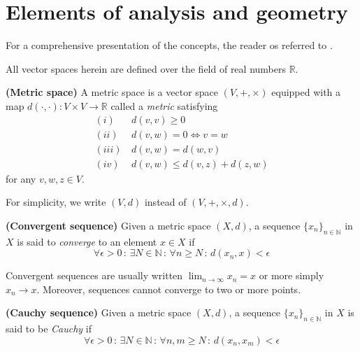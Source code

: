 \appendix

\chapter{Elements of analysis and geometry}
\label{app.elements_analysis_algebra}

For a comprehensive presentation of the concepts, the reader os referred to \cite{searcoid2002elements,pugh2002real}. 

All vector spaces herein are defined over the field of real numbers $\mathbb{R}$.

\begin{definition}
	\textbf{(Metric space)}
	A metric space is a vector space $(V,+,\times)$ equipped with a map $d(\cdot,\cdot):V \times V \rightarrow \mathbb{R}$ called a \textit{metric} satisfying
	\begin{align}
		(i) \, &d(v,v) \geq 0 \\
		(ii) \, &d(v,w) = 0 \Leftrightarrow v = w\\
		(iii) \, &d(v,w) = d(w,v) \\
		(iv) \, &d(v,w) \leq d(v,z) + d(z,w)
	\end{align}
	for any $v,w,z \in V$.
\end{definition}

For simplicity, we write $(V,d)$ instead of $(V,+,\times,d)$.

\begin{definition}
	\textbf{(Convergent sequence)}
	Given a metric space $(X,d)$, a sequence $\{x_n\}_{n\in\mathbb{N}}$ in $X$ is said to \textit{converge} to an element $x \in X$ if
	\begin{equation}
		\forall \epsilon > 0 \, : \, \exists N \in \mathbb{N} \, : \,  \forall n \geq N \, : \, d(x_n, x) < \epsilon
	\end{equation}
\end{definition}

Convergent sequences are usually written $\lim_{n \rightarrow \infty} x_n = x$ or more simply $x_n \rightarrow x$. Moreover, sequences cannot converge to two or more points.

\begin{definition}
	\textbf{(Cauchy sequence)}
	Given a metric space $(X,d)$, a sequence $\{x_n\}_{n\in\mathbb{N}}$ in $X$ is said to be \textit{Cauchy} if
	\begin{equation}
		\forall \epsilon > 0 \, : \, \exists N \in \mathbb{N} \, : \,  \forall n,m \geq N \, : \, d(x_n, x_m) < \epsilon
	\end{equation}
\end{definition}

